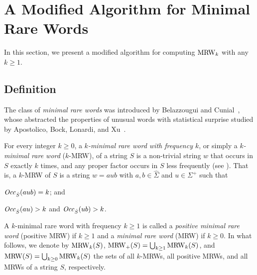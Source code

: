 
\section{A Modified Algorithm for Minimal Rare Words}
\label{sec:mrw}

In this section, we present a modified algorithm for computing $\MRWK[k]$ with any $k\ge 1$.

\subsection{Definition}
The class of \textit{minimal rare words} was introduced by Belazzougui and Cunial~\cite{belazzougui2015space:unusual}, whose abstracted the properties of unusual words with statistical surprise studied by Apostolico, Bock, Lonardi, and Xu~\cite{apostolico2000efficient}.

\begin{definition}\rm 
  For every integer $k\ge 0$,
  a \textit{$k$-minimal rare word with frequency $k$}, or simply 
  a \textit{$k$-minimal rare word} ($k$-MRW), of a string $S$ is a non-trivial string $w$ that occurs in $S$ exactly $k$ times, and any proper factor occurs in $S$ less frequently (see \cite{belazzougui2015space:unusual}). That is, a $k$-MRW of $S$ is a string $w = a u b$ with $a, b\in \hat\Sigma$ and $u \in \Sigma^+$ such that
\begin{enumerate*}[(i)]
\item $\Occ(aub) = k$; and 
\item $\Occ(au) > k$ and $\Occ(ub) > k$. 
\end{enumerate*}
\end{definition}

A $k$-minimal rare word with frequency $k\ge 1$ is called a \textit{positive minimal rare word} (positive MRW) if $k \ge 1$ and a \textit{minimal rare word} (MRW) if $k\ge 0$. 
In what follows, we denote by
$\MRW_k(S)$, 
$\MRW_{+}(S) = \bigcup_{k\ge 1} \MRW_k(S)$, and 
$\MRW(S) = \bigcup_{k\ge 0} \MRW_k(S)$
the sets of
all $k$-MRWs,
all positive MRWs, and
all MRWs
of a string $S$, respectively.


